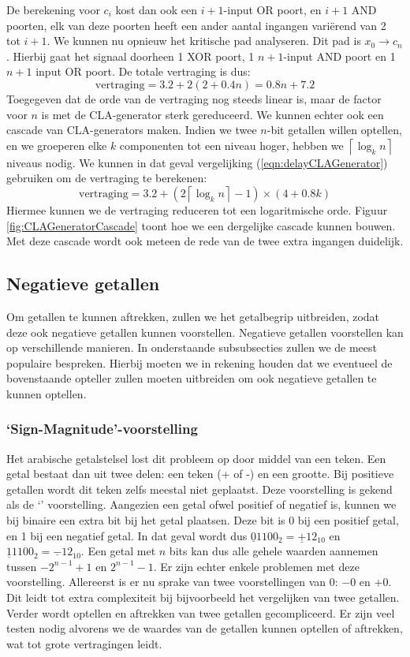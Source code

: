 De berekening voor $c_i$ kost dan ook een $i+1$-input OR poort, en $i+1$ AND poorten, elk van deze poorten heeft een ander aantal ingangen vari\"erend van 2 tot $i+1$. We kunnen nu opnieuw het kritische pad analyseren. Dit pad is $x_0\rightarrow c_n$. Hierbij gaat het signaal doorheen 1 XOR poort, 1 $n+1$-input AND poort en 1 $n+1$ input OR poort. De totale vertraging is dus:
\begin{equation}
\mbox{vertraging}=3.2+2\left(2+0.4n\right)=0.8n+7.2
\label{eqn:delayCLAGenerator}
\end{equation}
Toegegeven dat de orde van de vertraging nog steeds linear is, maar de factor voor $n$ is met de CLA-generator sterk gereduceerd. We kunnen echter ook een cascade van CLA-generators maken. Indien we twee $n$-bit getallen willen optellen, en we groeperen elke $k$ componenten tot een niveau hoger, hebben we $\left\lceil\log_kn\right\rceil$ niveaus nodig. We kunnen in dat geval vergelijking (\ref{eqn:delayCLAGenerator}) gebruiken om de vertraging te berekenen:
\begin{equation}
\mbox{vertraging}=3.2+\left(2\left\lceil\log_kn\right\rceil-1\right)\times\left(4+0.8k\right)
\end{equation}
Hiermee kunnen we de vertraging reduceren tot een logaritmische orde. Figuur \ref{fig:CLAGeneratorCascade} toont hoe we een dergelijke cascade kunnen bouwen. Met deze cascade wordt ook meteen de rede van de twee extra ingangen duidelijk.
\subsection{Negatieve getallen}
Om getallen te kunnen aftrekken, zullen we het getalbegrip uitbreiden, zodat deze ook negatieve getallen kunnen voorstellen. Negatieve getallen voorstellen kan op verschillende manieren. In onderstaande subsubsecties zullen we de meest populaire bespreken. Hierbij moeten we in rekening houden dat we eventueel de bovenstaande opteller zullen moeten uitbreiden om ook negatieve getallen te kunnen optellen.
\subsubsection{`Sign-Magnitude'-voorstelling}
Het arabische getalstelsel lost dit probleem op door middel van een teken. Een getal bestaat dan uit twee delen: een teken (+ of -) en een grootte. Bij positieve getallen wordt dit teken zelfs meestal niet geplaatst. Deze voorstelling is gekend als de `' voorstelling. Aangezien een getal ofwel positief of negatief is, kunnen we bij binaire een extra bit bij het getal plaatsen. Deze bit is 0 bij een positief getal, en 1 bij een negatief getal. In dat geval wordt dus $\underline{0}1100_2=\underline{+}12_{10}$ en $\underline{1}1100_2=\underline{-}12_{10}$. Een getal met $n$ bits kan dus alle gehele waarden aannemen tussen $-2^{n-1}+1$ en $2^{n-1}-1$. Er zijn echter enkele problemen met deze voorstelling. Allereerst is er nu sprake van twee voorstellingen van $0$: $-0$ en $+0$. Dit leidt tot extra complexiteit bij bijvoorbeeld het vergelijken van twee getallen. Verder wordt optellen en aftrekken van twee getallen gecompliceerd. Er zijn veel testen nodig alvorens we de waardes van de getallen kunnen optellen of aftrekken, wat tot grote vertragingen leidt.
